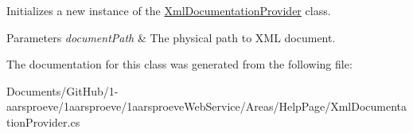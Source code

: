 Initializes a new instance of the \hyperlink{class__1aarsproeve_web_service_1_1_areas_1_1_help_page_1_1_xml_documentation_provider}{Xml\+Documentation\+Provider} class. 


\begin{DoxyParams}{Parameters}
{\em document\+Path} & The physical path to X\+M\+L document.\\
\hline
\end{DoxyParams}


The documentation for this class was generated from the following file\+:\begin{DoxyCompactItemize}
\item 
Documents/\+Git\+Hub/1-\/aarsproeve/1aarsproeve/1aarsproeve\+Web\+Service/\+Areas/\+Help\+Page/Xml\+Documentation\+Provider.\+cs\end{DoxyCompactItemize}
